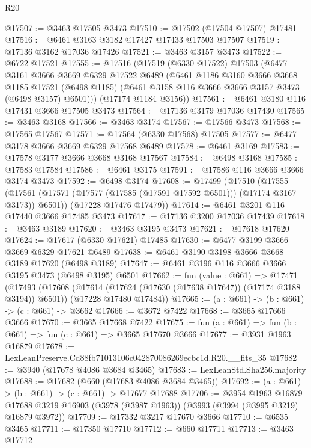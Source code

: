 \begin{lexlean}{R20}
\begin{coremodule}
@17507 := @3463 @17505 @3473
@17510 := @17502 (@17504 @17507) @17481
@17516 := @6461 @3163 @3182 @17427 @17433 @17503 @17507
@17519 := @17136 @3162 @17036 @17426
@17521 := @3463 @3157 @3473
@17522 := @6722 @17521
@17555 := @17516
    (@17519
      (@6330 @17522)
      @17503
      (@6477
        @3161
        @3666
        @3669
        @6329
        @17522
        @6489
        (@6461
          @1186
          @3160
          @3666
          @3668
          @1185
          @17521
          (@6498 @1185)
          (@6461 @3158 @116 @3666 @3666 @3157 @3473 (@6498 @3157) @6501)))
      (@17174 @1184 @3156))
@17561 := @6461 @3180 @116 @17431 @3666 @17505 @3473
@17564 := @17136 @3179 @17036 @17430
@17565 := @3463 @3168
@17566 := @3463 @3174
@17567 := @17566 @3473
@17568 := @17565 @17567
@17571 := @17564 (@6330 @17568) @17505
@17577 := @6477 @3178 @3666 @3669 @6329 @17568 @6489
@17578 := @6461 @3169
@17583 := @17578 @3177 @3666 @3668 @3168 @17567
@17584 := @6498 @3168
@17585 := @17583 @17584
@17586 := @6461 @3175
@17591 := @17586 @116 @3666 @3666 @3174 @3473
@17592 := @6498 @3174
@17608 := @17499
    (@17510
      (@17555 (@17561 (@17571 (@17577 (@17585 (@17591 @17592 @6501))) (@17174 @3167 @3173)) @6501))
      (@17228 @17476 @17479))
@17614 := @6461 @3201 @116 @17440 @3666 @17485 @3473
@17617 := @17136 @3200 @17036 @17439
@17618 := @3463 @3189
@17620 := @3463 @3195 @3473
@17621 := @17618 @17620
@17624 := @17617 (@6330 @17621) @17485
@17630 := @6477 @3199 @3666 @3669 @6329 @17621 @6489
@17638 := @6461 @3190 @3198 @3666 @3668 @3189 @17620 (@6498 @3189)
@17647 := @6461 @3196 @116 @3666 @3666 @3195 @3473 (@6498 @3195) @6501
@17662 := fun (value : @661) =>
  @17471
    (@17493
      (@17608 (@17614 (@17624 (@17630 (@17638 @17647)) (@17174 @3188 @3194)) @6501))
      (@17228 @17480 @17484))
@17665 := (a : @661) -> (b : @661) -> (c : @661) -> @3662
@17666 := @3672 @7422
@17668 := @3665 @17666 @3666
@17670 := @3665 @17668 @7422
@17675 := fun (a : @661) => fun (b : @661) => fun (c : @661) => @3665 @17670 @3666
@17677 := @3931 @1963 @16879
@17678 := LexLeanPreserve.Cd88fb71013106c042870086269ecbc1d.R20.__fits_35
@17682 := @3940 (@17678 @4086 @3684 @3465)
@17683 := LexLeanStd.Sha256.majority
@17688 := @17682 (@660 (@17683 @4086 @3684 @3465))
@17692 := (a : @661) -> (b : @661) -> (c : @661) -> @17677 @17688
@17706 := @3954
    @1963
    @16879
    @17688
    @3219
    @16903
    (@3978 (@3987 @1963))
    (@3993 (@3994 (@3995 @3219) @16879 @3972))
@17709 := @17332 @3217 @17670 @3666
@17710 := @6535 @3465
@17711 := @17350 @17710
@17712 := @660 @17711
@17713 := @3463 @17712

\end{coremodule}
\end{lexlean}
